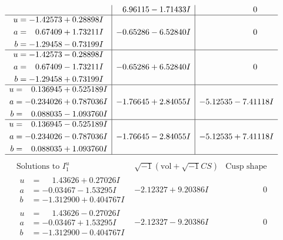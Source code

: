 \documentclass[1p]{elsarticle_modified}
\theoremstyle{definition}
\newcommand{\I}{\sqrt{-1}}
\begin{document}
$$\begin{array}{c|c|c}
 & \phantom{-}6.96115 - 1.71433 I & \phantom{-0.000000 } 0 \\ \hline\begin{aligned}
u &= -1.42573 + 0.28898 I \\
a &= \phantom{-}0.67409 + 1.73211 I \\
b &= -1.29458 - 0.73199 I\end{aligned}
 & -0.65286 - 6.52840 I & \phantom{-0.000000 } 0 \\ \hline\begin{aligned}
u &= -1.42573 - 0.28898 I \\
a &= \phantom{-}0.67409 - 1.73211 I \\
b &= -1.29458 + 0.73199 I\end{aligned}
 & -0.65286 + 6.52840 I & \phantom{-0.000000 } 0 \\ \hline\begin{aligned}
u &= \phantom{-}0.136945 + 0.525189 I \\
a &= -0.234026 + 0.787036 I \\
b &= \phantom{-}0.088035 - 1.093760 I\end{aligned}
 & -1.76645 + 2.84055 I & -5.12535 - 7.41118 I \\ \hline\begin{aligned}
u &= \phantom{-}0.136945 - 0.525189 I \\
a &= -0.234026 - 0.787036 I \\
b &= \phantom{-}0.088035 + 1.093760 I\end{aligned}
 & -1.76645 - 2.84055 I & -5.12535 + 7.41118 I\\
 \hline 
 \end{array}$$\newpage$$\begin{array}{c|c|c}  
\text{Solutions to }I^u_{1}& \I (\text{vol} + \sqrt{-1}CS) & \text{Cusp shape}\\
 \hline 
\begin{aligned}
u &= \phantom{-}1.43626 + 0.27026 I \\
a &= -0.03467 - 1.53295 I \\
b &= -1.312900 + 0.404767 I\end{aligned}
 & -2.12327 + 9.20386 I & \phantom{-0.000000 } 0 \\ \hline\begin{aligned}
u &= \phantom{-}1.43626 - 0.27026 I \\
a &= -0.03467 + 1.53295 I \\
b &= -1.312900 - 0.404767 I\end{aligned}
 & -2.12327 - 9.20386 I & \phantom{-0.000000 } 0 \\ \hline\begin{aligned}

\end{aligned}
\end{array}$$
\end{document}
